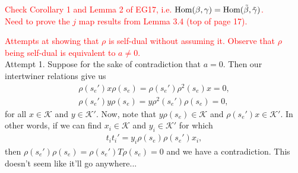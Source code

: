 \noindent\textcolor{red}{Check Corollary 1 and Lemma 2 of EG17, i.e. $\textup{Hom}(\beta, \gamma) = \textup{Hom}(\tilde{\beta}, \tilde{\gamma})$.}\\

\noindent\textcolor{red}{Need to prove the $j$ map results from Lemma 3.4 (top of page 17).}\\

\newpage

\noindent\textcolor{red}{Attempts at showing that $\rho$ is self-dual without assuming it. Observe that $\rho$ being self-dual is equivalent to $a \neq 0$.}\\ %

\noindent Attempt 1. Suppose for the sake of contradiction that $a = 0$. Then our intertwiner relations give us
\begin{align*}
\rho(s_e')x\rho(s_e) = \rho(s_e')\rho^2(s_e)x = 0,\\
\rho(s_e')y\rho(s_e) = y\rho^2(s_e')\rho(s_e) = 0,
\end{align*}
\noindent for all $x \in \mathcal{K}$ and $y \in \mathcal{K}'$. Now, note that $y\rho(s_e) \in \mathcal{K}$ and $\rho(s_e')x \in \mathcal{K}'$. In other words, if we can find $x_i \in \mathcal{K}$ and $y_i \in \mathcal{K}'$ for which
\begin{align*}
t_it_i' = y_i\rho(s_e)\rho(s_e')x_i,
\end{align*}
\noindent then $\rho(s_e')\rho(s_e) = \rho(s_e')T\rho(s_e) = 0$ and we have a contradiction. This doesn't seem like it'll go anywhere...\\

